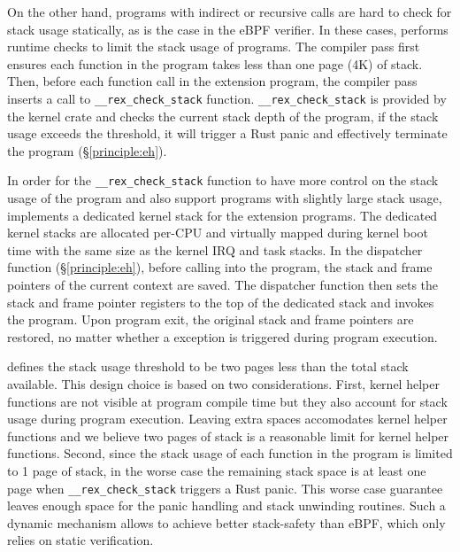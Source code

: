 On the other hand, programs with indirect or recursive calls are hard to check
    for stack usage statically, as is the case in the eBPF verifier.
In these cases, \projname{} performs runtime checks to limit the stack usage of
    programs.
The \projname{} compiler pass first ensures each function in the program takes
    less than one page (4K) of stack.
Then, before each function call in the extension program, the \projname{}
    compiler pass inserts a call to \texttt{\_\_rex\_check\_stack} function.
\texttt{\_\_rex\_check\_stack} is provided by the kernel crate and checks the
    current stack depth of the program, if the stack usage exceeds the
    threshold, it will trigger a Rust panic and effectively terminate the
    program (\S\ref{principle:eh}).

In order for the \texttt{\_\_rex\_check\_stack} function to have more control
    on the stack usage of the program and also support programs with slightly
    large stack usage, \projname{} implements a dedicated kernel stack for the
    extension programs.
The dedicated kernel stacks are allocated per-CPU and virtually mapped during
    kernel boot time with the same size as the kernel IRQ and task stacks.
In the dispatcher function (\S\ref{principle:eh}), before calling into the
    \projname{} program, the stack and frame pointers of the current context
    are saved.
The dispatcher function then sets the stack and frame pointer registers to the
    top of the dedicated stack and invokes the program.
Upon program exit, the original stack and frame pointers are restored, no
    matter whether a exception is triggered during program execution.

\projname{} defines the stack usage threshold to be two pages less than the
    total stack available.
This design choice is based on two considerations.
First, kernel helper functions are not visible at program compile time but they
    also account for stack usage during program execution.
Leaving extra spaces accomodates kernel helper functions and we believe two
    pages of stack is a reasonable limit for kernel helper functions.
Second, since the stack usage of each function in the program is limited to
    1 page of stack, in the worse case the remaining stack space is at least
    one page when \texttt{\_\_rex\_check\_stack} triggers a Rust panic.
This worse case guarantee leaves enough space for the panic handling and stack
    unwinding routines.
Such a dynamic mechanism allows \projname{} to achieve better stack-safety than
    eBPF, which only relies on static verification.

